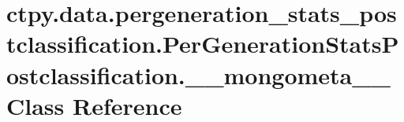\hypertarget{classctpy_1_1data_1_1pergeneration__stats__postclassification_1_1_per_generation_stats_postclassification_1_1____mongometa____}{\section{ctpy.\-data.\-pergeneration\-\_\-stats\-\_\-postclassification.\-Per\-Generation\-Stats\-Postclassification.\-\_\-\-\_\-mongometa\-\_\-\-\_\- Class Reference}
\label{classctpy_1_1data_1_1pergeneration__stats__postclassification_1_1_per_generation_stats_postclassification_1_1____mongometa____}
}
